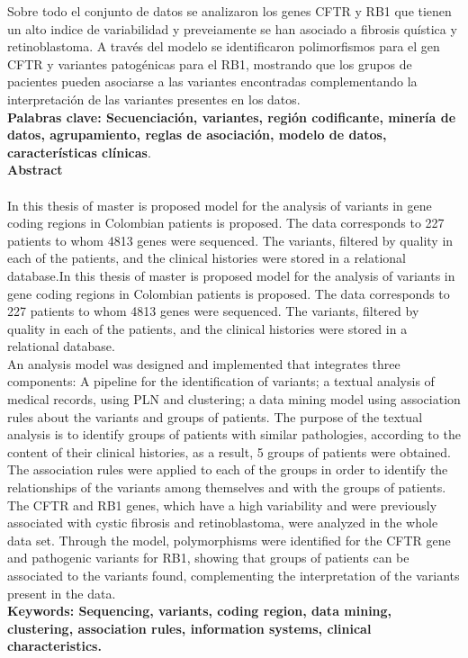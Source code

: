 Sobre todo el conjunto de datos se analizaron los genes CFTR y RB1 que tienen un alto indice de variabilidad y preveiamente se han asociado a fibrosis quística y retinoblastoma. A través del modelo se identificaron polimorfismos para el gen CFTR y variantes patogénicas para el RB1, mostrando que los grupos de pacientes pueden asociarse  a las variantes encontradas complementando la interpretación de las variantes presentes en los datos.   \\

\textbf{\small Palabras clave: Secuenciación, variantes, región codificante, minería de datos, agrupamiento, reglas de asociación, modelo de datos, características clínicas}.\\


\textbf{\LARGE Abstract}\\\\
In this thesis of master is proposed  model for the analysis of variants in gene coding regions in Colombian patients is proposed. The data corresponds to 227 patients to whom 4813 genes were sequenced. The variants, filtered by quality in each of the patients, and the clinical histories were stored in a relational database.In this thesis of master is proposed  model for the analysis of variants in gene coding regions in Colombian patients is proposed. The data corresponds to 227 patients to whom 4813 genes were sequenced. The variants, filtered by quality in each of the patients, and the clinical histories were stored in a relational database. \\

An analysis model was designed and implemented that integrates three components: A pipeline for the identification of variants; a textual analysis of medical records, using PLN and clustering; a data mining model using association rules about the variants and groups of patients. The purpose of the textual analysis is to identify groups of patients with similar pathologies, according to the content of their clinical histories, as a result, 5 groups of patients were obtained. The association rules were applied to each of the groups in order to identify the relationships of the variants among themselves and with the groups of patients. \\

The CFTR and RB1 genes, which have a high variability and were previously associated with cystic fibrosis and retinoblastoma, were analyzed in the whole data set. Through the model, polymorphisms were identified for the CFTR gene and pathogenic variants for RB1, showing that groups of patients can be associated to the variants found, complementing the interpretation of the variants present in the data. \\


\textbf{\small Keywords: Sequencing, variants, coding region, data mining, clustering, association rules, information systems, clinical characteristics.}\\